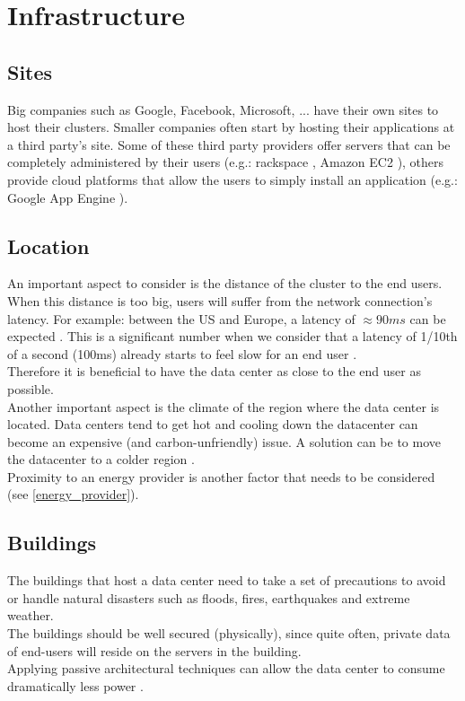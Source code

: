 \documentclass[12pt]{report}
\begin{document}
\section{Infrastructure}
\subsection{Sites}
Big companies such as Google, Facebook, Microsoft, ... have their own
sites to host their clusters. Smaller companies often start by hosting
their applications at a third party's site. Some of these third party
providers offer servers that can be completely administered by their
users (e.g.: rackspace \cite{rackspace}, Amazon EC2 \cite{amazon_ec2}), others provide cloud
platforms that allow the users to simply install an application
(e.g.: Google App Engine \cite{google_app_engine}).

\subsection{Location}
An important aspect to consider is the distance of
the cluster to the end users. When this distance is too big, users will suffer from the
network connection's latency. For example: between the US
and Europe, a latency of $\approx 90ms$ can be expected
\cite{verizon_latency}.
This is a significant number when we consider that a latency of 1/10th
of a second (100ms) already starts to feel slow for an end user 
\cite{web_app_latency}.\\
Therefore it is beneficial to have the data center as close to the end
user as possible.\\

Another important aspect is the climate of the region where the data
center is located. Data centers tend to get hot and cooling down the
datacenter can become an expensive (and carbon-unfriendly) issue.
A solution can be to move the datacenter to a colder region 
\cite{datacenter_cold}.\\

Proximity to an energy provider is another factor that needs to be
considered (see \cref{energy_provider}).

\subsection{Buildings}
The buildings that host a data center need to take a set of precautions to
avoid or handle natural disasters such as floods, fires, earthquakes
and extreme weather.\\
The buildings should be well secured (physically), since quite often, 
private data of end-users will reside on the servers in the
building.\\
Applying passive architectural techniques can allow
the data center to consume dramatically less power \cite{passive_architecture}.
 
\end{document}
